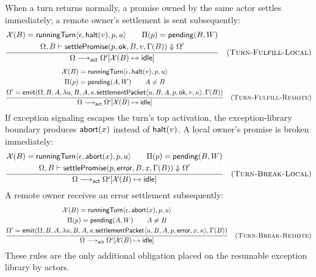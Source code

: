 When a turn returns normally, a promise owned by the same actor settles
immediately; a remote owner's settlement is sent subsequently:
{\small\[
\dfrac{\begin{gathered}
 \mathcal X(B)=\mathsf{runningTurn}\langle\epsilon,\mathsf{halt}(v),p,u\rangle
 \qquad \Pi(p)=\mathsf{pending}(B,W)\\
 \Omega,B\vdash\mathsf{settlePromise}(p,\mathsf{ok},B,v,\Gamma(B))
    \Downarrow\Omega'
\end{gathered}}
 {\Omega\longrightarrow_{\mathsf{act}}
  \Omega'[\mathcal X(B)\mapsto\mathsf{idle}]}
\quad(\textsc{Turn-Fulfill-Local})
\]}
{\small\[
\dfrac{\begin{gathered}
 \mathcal X(B)=\mathsf{runningTurn}\langle\epsilon,\mathsf{halt}(v),p,u\rangle\\
 \Pi(p)=\mathsf{pending}(A,W)\qquad A\ne B\\
 \Omega'=\mathsf{emit}(\Omega,B,A,
  \lambda u,B,A,\kappa.\mathsf{settlementPacket}\langle
     u,B,A,p,\mathsf{ok},v,\kappa\rangle,\Gamma(B))
\end{gathered}}
 {\Omega\longrightarrow_{\mathsf{act}}
  \Omega'[\mathcal X(B)\mapsto\mathsf{idle}]}
\quad(\textsc{Turn-Fulfill-Remote})
\]}
If exception signaling escapes the turn's top activation, the
exception-library boundary produces $\mathsf{abort}(x)$ instead of
$\mathsf{halt}(v)$.  A local owner's promise is broken immediately:
{\small\[
\dfrac{\begin{gathered}
 \mathcal X(B)=\mathsf{runningTurn}\langle\epsilon,\mathsf{abort}(x),p,u\rangle
 \qquad \Pi(p)=\mathsf{pending}(B,W)\\
 \Omega,B\vdash\mathsf{settlePromise}(p,\mathsf{error},B,x,\Gamma(B))
    \Downarrow\Omega'
\end{gathered}}
 {\Omega\longrightarrow_{\mathsf{act}}
  \Omega'[\mathcal X(B)\mapsto\mathsf{idle}]}
\quad(\textsc{Turn-Break-Local})
\]}
A remote owner receives an error settlement subsequently:
{\small\[
\dfrac{\begin{gathered}
 \mathcal X(B)=\mathsf{runningTurn}\langle\epsilon,\mathsf{abort}(x),p,u\rangle\\
 \Pi(p)=\mathsf{pending}(A,W)\qquad A\ne B\\
 \Omega'=\mathsf{emit}(\Omega,B,A,
  \lambda u,B,A,\kappa.\mathsf{settlementPacket}\langle
     u,B,A,p,\mathsf{error},x,\kappa\rangle,\Gamma(B))
\end{gathered}}
 {\Omega\longrightarrow_{\mathsf{act}}
  \Omega'[\mathcal X(B)\mapsto\mathsf{idle}]}
\quad(\textsc{Turn-Break-Remote})
\]}
These rules are the only additional obligation placed on the resumable
exception library by actors.

